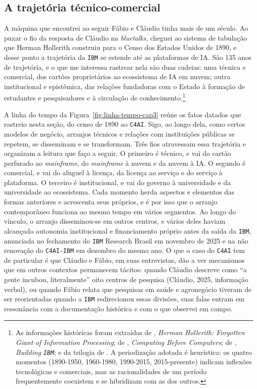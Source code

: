 \subsection{A trajetória técnico-comercial}
\label{subsec:trajetoria_tecnico_comercial}

A máquina que encontrei ao seguir Fábio e Cláudio tinha mais de um século. Ao puxar o fio da resposta de Cláudio na \textit{bluetalks}, cheguei ao sistema de tabulação que Herman Hollerith construiu para o Censo dos Estados Unidos de 1890, e desse ponto a trajetória da \texttt{IBM} se estende até as plataformas de IA. São 135 anos de trajetória, e o que me interessa rastrear nela são duas cadeias: uma técnica e comercial, dos cartões proprietários ao ecossistema de IA em nuvem; outra institucional e epistêmica, das relações fundadoras com o Estado à formação de estudantes e pesquisadores e à circulação de conhecimento.\footnote{As informações históricas foram extraídas de \textcite{Austrian1982Hollerith}, \textit{Herman Hollerith: Forgotten Giant of Information Processing}; de \textcite{ComputingBeforeComputers1990}, \textit{Computing Before Computers}; de \textcite{Pugh1995Building}, \textit{Building \texttt{IBM}}; e da trilogia de \textcite{Cortada2019IBM, Cortada1999Networked, Cortada1993Before}. A periodização adotada é heurística: os quatro momentos (1890-1950, 1960-1980, 1990-2015, 2015-presente) indicam inflexões tecnológicas e comerciais, mas as racionalidades de um período frequentemente coexistem e se hibridizam com as dos outros.}

A linha do tempo da Figura~\ref{fig:linha-tempo-cap3} reúne os fatos datados que rastreio nesta seção, do censo de 1890 ao \texttt{C4AI}. Sigo, ao longo dela, como certos modelos de negócio, arranjos técnicos e relações com instituições públicas se repetem, se disseminam e se transformam. Três fios atravessam essa trajetória e organizam a leitura que faço a seguir. O primeiro é técnico, e vai do cartão perfurado ao \textit{mainframe}, do \textit{mainframe} à nuvem e da nuvem à IA. O segundo é comercial, e vai do aluguel à licença, da licença ao serviço e do serviço à plataforma. O terceiro é institucional, e vai do governo à universidade e da universidade ao ecossistema. Cada momento herda aspectos e elementos das formas anteriores e acrescenta seus próprios, e é por isso que o arranjo contemporâneo funciona ao mesmo tempo em vários segmentos. Ao longo do vínculo, o arranjo disseminou-se em outros centros, e vários deles haviam alcançado autonomia institucional e financiamento próprio antes da saída da \texttt{IBM}, anunciada no fechamento do \texttt{IBM} Research Brasil em novembro de 2025 e na não renovação do \texttt{C4AI-IBM} em dezembro do mesmo ano. O que o caso do \texttt{C4AI} tem de particular é que Cláudio e Fábio, em suas entrevistas, dão a ver mecanismos que em outros contextos permanecem tácitos: quando Cláudio descreve como \enquote{a gente incubou, literalmente} oito centros de pesquisa (Cláudio, 2025, informação verbal), ou quando Fábio relata que pesquisas em saúde e agronegócio tiveram de ser reorientadas quando a \texttt{IBM} redirecionou essas divisões, suas falas entram em ressonância com a documentação histórica e com o que observei em campo.

